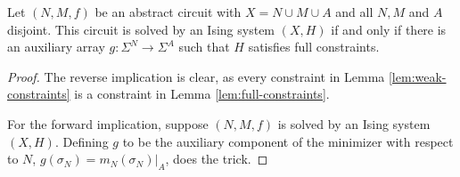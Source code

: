 \documentclass{article}
\begin{document}
\begin{lem}\label{lem:full-constraints}
  Let $(N, M, f)$ be an abstract circuit with $X = N \cup M \cup A$ and all $N, M$ and $A$ disjoint. This circuit is solved by an Ising system $(X, H)$ if and only if there is an auxiliary array $g:\Sigma^N \to \Sigma^A$ such that $H$ satisfies full constraints.
\end{lem}
\begin{proof}
  The reverse implication is clear, as every constraint in Lemma \ref{lem:weak-constraints} is a constraint in Lemma \ref{lem:full-constraints}. 

  For the forward implication, suppose $(N,M,f)$ is solved by an Ising system $(X,H)$. Defining $g$ to be the auxiliary component of the minimizer with respect to $N$, $g(\sigma_N) = m_N(\sigma_N)|_{A}$, does the trick.
\end{proof}
\end{document}
